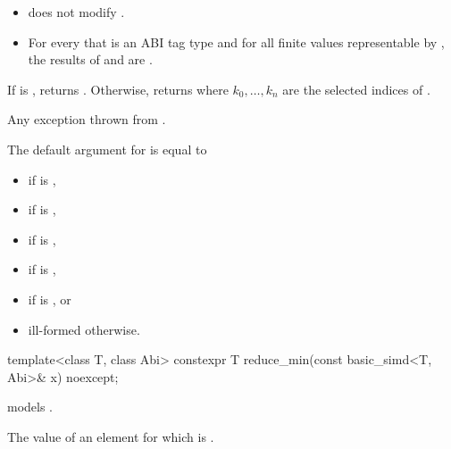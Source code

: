 \begin{itemdescr}
  \pnum\expects
  \begin{itemize}
    \item {} does not modify .

    \item For every  that is an ABI tag type and for all finite
      values  representable by , the results of
       and  are .
  \end{itemize}

  \pnum\returns
  If  is , returns .
  Otherwise, returns  where $k_0, \ldots, k_n$ are the selected indices of
  .

  \pnum\throws
  Any exception thrown from .

  \pnum\remarks
  The default argument for  is equal to
  \begin{itemize}
    \item {} if  is ,
    \item {} if  is ,
    \item {} if  is ,
    \item {} if  is ,
    \item {} if  is , or
    \item ill-formed otherwise.
  \end{itemize}
\end{itemdescr}

\begin{itemdecl}
template<class T, class Abi> constexpr T reduce_min(const basic_simd<T, Abi>& x) noexcept;
\end{itemdecl}

\begin{itemdescr}
  \pnum\constraints
   models .

  \pnum\returns
  The value of an element  for which  is 
  \foralli.
\end{itemdescr}

